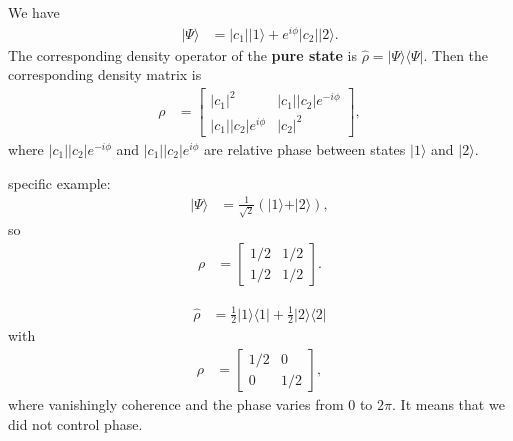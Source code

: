 \documentclass[../../note.tex]{subfiles}
\begin{document}
\begin{example}
    We have
    \begin{align}
        \vert \Psi \rangle
        &= \vert c_1 \vert \vert 1 \rangle + e^{i \phi} \vert c_2 \vert \vert 2 \rangle.
    \end{align}
    The corresponding density operator of the \textbf{pure state} is $\hat{\rho} = \vert \Psi \rangle \langle \Psi \vert$. Then the corresponding density matrix is 
    \begin{align}
        \rho
        &= \left[\begin{matrix}
            \vert c_1 \vert^2 & \vert c_1 \vert \vert c_2 \vert e^{-i \phi} \\
            \vert c_1 \vert \vert c_2 \vert e^{i \phi} & \vert c_2 \vert^2
        \end{matrix}\right],
    \end{align}
    where $\vert c_1 \vert \vert c_2 \vert e^{-i \phi}$ and $\vert c_1 \vert \vert c_2 \vert e^{i \phi}$ are relative phase between states $\vert 1 \rangle$ and $\vert 2 \rangle$.

    specific example:
    \begin{align}
        \vert \Psi \rangle
        &= \frac{1}{\sqrt{2}} \left(\vert 1 \rangle + \vert 2 \rangle \right),
    \end{align}
    so
    \begin{align}
        \rho
        &= \left[
        \begin{matrix}
            1/2 & 1/2 \\
            1/2 & 1/2
        \end{matrix}
        \right].
    \end{align}
\end{example}

\begin{example}
    \begin{align}
        \hat{\rho}
        &= \frac{1}{2} \vert 1 \rangle \langle 1 \vert + \frac{1}{2} \vert 2 \rangle \langle 2 \vert
    \end{align}
    with 
    \begin{align}
        \rho
        &= \left[\begin{matrix}
            1/2 & 0 \\
            0 & 1/2
        \end{matrix}\right],
    \end{align}
    where vanishingly coherence and the phase varies from $0$ to $2 \pi$. It means that we did not control phase.
\end{example}
\end{document}
